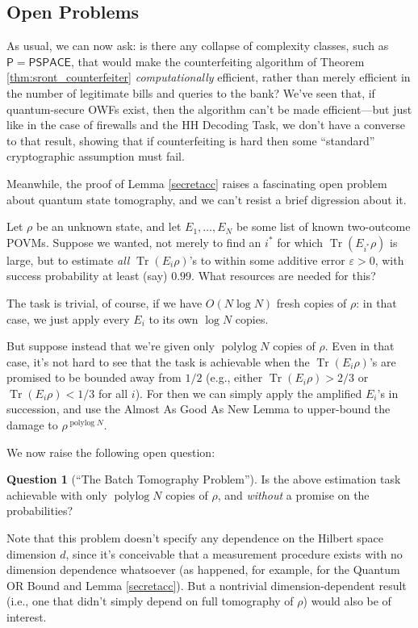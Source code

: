 \documentclass[12pt]{report}
\theoremstyle{plain}
\theoremstyle{definition}
\newtheorem{question}[theorem]{Question}
\newcommand{\eps}{\varepsilon}
\newcommand{\Tr}{\operatorname{Tr}}
\begin{document}
\subsection{Open Problems}

As usual, we can now ask: is there any collapse of complexity classes, such as $\mathsf{P}=\mathsf{PSPACE}$, that would make the counterfeiting algorithm of Theorem \ref{thm:sront_counterfeiter} {\em computationally} efficient, rather than merely efficient in the number of legitimate bills and queries to the bank?  We've seen that, if quantum-secure OWFs exist, then the algorithm can't be made efficient---but just like in the case of firewalls and the HH Decoding Task, we don't have a converse to that result, showing that if counterfeiting is hard then some ``standard'' cryptographic assumption must fail.

Meanwhile, the proof of Lemma \ref{secretacc} raises a fascinating open problem about quantum state tomography, and we can't resist a brief digression about it.

Let $\rho$ be an unknown state, and let $E_1,\ldots,E_N$ be some list of known two-outcome POVMs.  Suppose we wanted, not merely to find an $i^{*}$ for which $\Tr(E_{i^{*}} \rho)$ is large, but to estimate {\em all} $\Tr(E_i\rho)$'s to within some additive error $\eps > 0$, with success probability at least (say) $0.99$.  What resources are needed for this?

The task is trivial, of course, if we have $O(N \log N)$ fresh copies of $\rho$: in that case, we just apply every $E_i$ to its own $\log N$ copies.

But suppose instead that we're given only $\operatorname*{polylog} N$ copies of $\rho$.  Even in that case, it's not hard to see that the task is achievable when the $\Tr(E_i\rho)$'s are promised to be bounded away from $1/2$ (e.g., either $\Tr(E_i\rho)>2/3$ or $\Tr(E_i\rho)<1/3$ for all $i$).  For then we can simply apply the amplified $E_i$'s in succession, and use the Almost As Good As New Lemma to upper-bound the damage to $\rho^{\operatorname*{polylog} N}$.

We now raise the following open question:

\begin{question}[``The Batch Tomography Problem'']
Is the above estimation task achievable with only $\operatorname*{polylog} N$ copies of $\rho$, and {\em without} a promise on the probabilities?
\end{question}

Note that this problem doesn't specify any dependence on the Hilbert space dimension $d$, since it's conceivable that a measurement procedure exists with no dimension dependence whatsoever (as happened, for example, for the Quantum OR Bound and Lemma \ref{secretacc}).  But a nontrivial dimension-dependent result (i.e., one that didn't simply depend on full tomography of $\rho$) would also be of interest.
\end{document}
